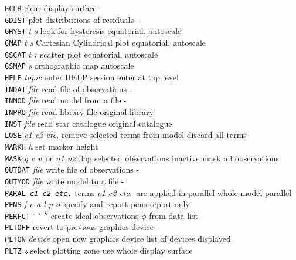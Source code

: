 {\begin{small}
\begin{tabs}
{\tt GCLR} \> clear display surface \> - \\
{\tt GDIST} \> plot distributions of residuals \> - \\
{\tt GHYST} {\it t s} \> look for hysteresis \> equatorial, autoscale \\
{\tt GMAP} {\it t s} \> Cartesian Cylindrical plot \> equatorial, autoscale \\
{\tt GSCAT} {\it t r} \> scatter plot \> equatorial, autoscale \\
{\tt GSMAP} {\it s} \> orthographic map \> autoscale \\
{\tt HELP} {\it topic} \> enter HELP session \> enter at top level \\
{\tt INDAT} {\it file} \> read file of observations \> - \\
{\tt INMOD} {\it file} \> read model from a file \> - \\
{\tt INPRO} {\it file} \> read library file \> original library \\
{\tt INST} {\it file} \> read star catalogue \> original catalogue \\
{\tt LOSE} {\it c1 c2 etc.} \> remove selected terms from model \>
                        discard all terms \\
{\tt MARKH} {\it h} \> set marker height  \\
{\tt MASK} {\it q c v}\, or {\it n1 n2} \>
                        flag selected observations inactive \>
                        mask all observations \\
{\tt OUTDAT} {\it file} \> write file of observations \> - \\
{\tt OUTMOD} {\it file} \> write model to a file \> - \\
{\tt PARAL {\it c1 c2 etc.}} \> terms
                        {\it c1 c2 etc.}\ are applied in parallel \>
                        whole model parallel \\
{\tt PENS} {\it f c a l p o} \> specify and report pens \>
                        report only \\
{\tt PERFCT} {\it $^\circ$ $'$ $''$} \> create ideal observations \>
                        $\phi$ from data list \\
{\tt PLTOFF} \> revert to previous graphics device \> - \\
{\tt PLTON} {\it device} \> open new graphics device \>
                        list of devices displayed \\
{\tt PLTZ} {\it z} \> select plotting zone \>
                        use whole display surface \\

\end{tabs}
\end{small}}
